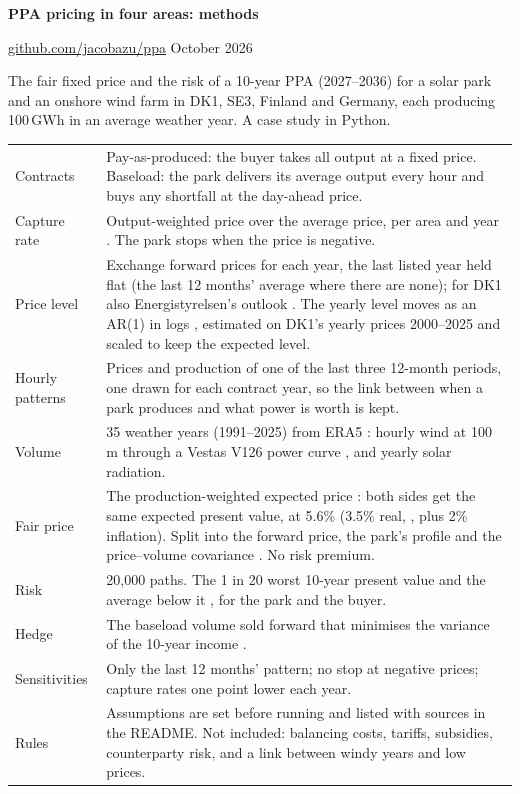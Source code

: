 \documentclass[11pt,a4paper]{article}
\begin{document}
{\sffamily\bfseries\Large PPA pricing in four areas: methods}\par
\href{https://github.com/jacobazu/ppa}{github.com/jacobazu/ppa} \textperiodcentered{} October 2026

The fair fixed price and the risk of a 10-year PPA (2027--2036) for a solar park and an onshore wind farm in DK1, SE3, Finland and Germany, each producing 100\,GWh in an average weather year. A case study in Python.

\begin{center}\small
\begin{tabularx}{\linewidth}{@{}lL@{}}
\toprule
Contracts & Pay-as-produced: the buyer takes all output at a fixed price. Baseload: the park delivers its average output every hour and buys any shortfall at the day-ahead price. \\
Capture rate & Output-weighted price over the average price, per area and year \citep{hirth2013}. The park stops when the price is negative. \\
Price level & Exchange forward prices for each year, the last listed year held flat (the last 12 months' average where there are none); for DK1 also Energistyrelsen's outlook \citep{soeb25}. The yearly level moves as an AR(1) in logs \citep{lucia2002}, estimated on DK1's yearly prices 2000--2025 and scaled to keep the expected level. \\
Hourly patterns & Prices and production of one of the last three 12-month periods, one drawn for each contract year, so the link between when a park produces and what power is worth is kept. \\
Volume & 35 weather years (1991--2025) from ERA5 \citep{hersbach2020}: hourly wind at 100\,m through a Vestas V126 power curve \citep{staffell2016}, and yearly solar radiation. \\
Fair price & The production-weighted expected price \citep{qorbanian2024}: both sides get the same expected present value, at 5.6\% (3.5\% real, \citealp{fm2026}, plus 2\% inflation). Split into the forward price, the park's profile and the price--volume covariance \citep{chatziandreou2026}. No risk premium. \\
Risk & 20{,}000 paths. The 1 in 20 worst 10-year present value and the average below it \citep{artzner1999}, for the park and the buyer. \\
Hedge & The baseload volume sold forward that minimises the variance of the 10-year income \citep{ederington1979}. \\
Sensitivities & Only the last 12 months' pattern; no stop at negative prices; capture rates one point lower each year. \\
Rules & Assumptions are set before running and listed with sources in the README. Not included: balancing costs, tariffs, subsidies, counterparty risk, and a link between windy years and low prices. \\
\bottomrule
\end{tabularx}
\end{center}
\end{document}
